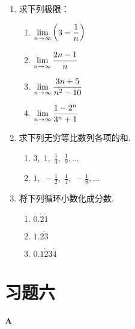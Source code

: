 \begin{ex}
\begin{enumerate}
    \item 求下列极限：
\begin{multicols}{2}
    \begin{enumerate}[(1)]
        \item $\lim\limits_{n\to \infty} \left(3-\dfrac{1}{n}\right)$
        \item $\lim\limits_{n\to \infty}\dfrac{2n-1}{n} $
        \item $\lim\limits_{n\to \infty}\dfrac{3n+5}{n^2-10} $
        \item $\lim\limits_{n\to \infty}\dfrac{1-2^n}{3^n+1} $
    \end{enumerate}
\end{multicols}
    \item 求下列无穷等比数列各项的和.
\begin{multicols}{2}
    \begin{enumerate}[(1)]
        \item $3,\; 1,\; \frac{1}{3},\; \frac{1}{9},\ldots$
        \item $1,\; -\frac{1}{2},\; \frac{1}{4},\; -\frac{1}{8},\ldots$
    \end{enumerate}
\end{multicols}
    \item 将下列循环小数化成分数.
\begin{multicols}{3}
\begin{enumerate}[(1)]
    \item $0.\dot{2}\dot{1}$
    \item $1.2\dot{3}$
    \item $0.1\dot{2}3\dot{4}$
\end{enumerate}
\end{multicols}
\end{enumerate}
\end{ex}

\section*{习题六}
\begin{center}
    \bfseries A
\end{center}

